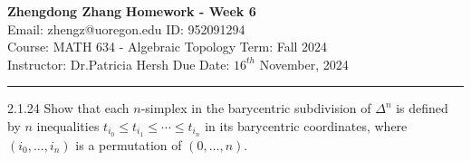 \documentclass[a4paper, 12pt]{article}
\begin{document}
\noindent
\large\textbf{Zhengdong Zhang} \hfill \textbf{Homework - Week 6}   \\
Email: zhengz@uoregon.edu \hfill ID: 952091294 \\
\normalsize Course: MATH 634 - Algebraic Topology  \hfill Term: Fall 2024\\
Instructor: Dr.Patricia Hersh \hfill Due Date: $16^{th}$ November, 2024 \\
\noindent\rule{7in}{2.8pt}
\begin{problem}{2.1.24}
Show that each \(n\)-simplex in the barycentric subdivision of \(\Delta^n\) is defined by \(n\) inequalities \(t_{i_0}\leq t_{i_1}\leq \cdots \leq t_{i_n}\) in its 
barycentric coordinates, where \((i_0,\ldots,i_n)\) is a permutation of \((0,\ldots,n)\). 
\end{problem}
\end{document}
